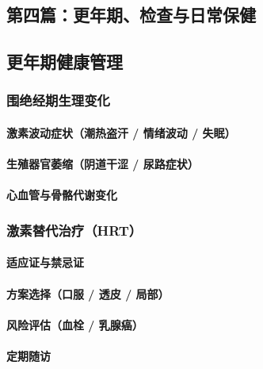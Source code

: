 \begin{enumerate}
\part{第四篇：更年期、检查与日常保健}

\chapter{更年期健康管理}

\section{围绝经期生理变化}
\subsection{激素波动症状（潮热盗汗 / 情绪波动 / 失眠）}
\subsection{生殖器官萎缩（阴道干涩 / 尿路症状）}
\subsection{心血管与骨骼代谢变化}

\section{激素替代治疗（HRT）}
\subsection{适应证与禁忌证}
\subsection{方案选择（口服 / 透皮 / 局部）}
\subsection{风险评估（血栓 / 乳腺癌）}
\subsection{定期随访}


\end{enumerate}
